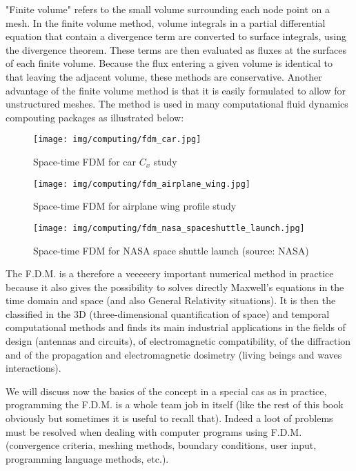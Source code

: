 	"Finite volume" refers to the small volume surrounding each node point on a mesh. In the finite volume method, volume integrals in a partial differential equation that contain a divergence term are converted to surface integrals, using the divergence theorem. These terms are then evaluated as fluxes at the surfaces of each finite volume. Because the flux entering a given volume is identical to that leaving the adjacent volume, these methods are conservative. Another advantage of the finite volume method is that it is easily formulated to allow for unstructured meshes. The method is used in many computational fluid dynamics compouting packages as illustrated below:
	\begin{figure}[H]
		\centering
		\texttt{[image: img/computing/fdm\_car.jpg]}
		\caption{Space-time FDM for car $C_x$ study}
	\end{figure}
	\begin{figure}[H]
		\centering
		\texttt{[image: img/computing/fdm\_airplane\_wing.jpg]}
		\caption{Space-time FDM for airplane wing profile study}
	\end{figure}
	\begin{figure}[H]
		\centering
		\texttt{[image: img/computing/fdm\_nasa\_spaceshuttle\_launch.jpg]}
		\caption[Space-time FDM for NASA space shuttle launch]{Space-time FDM for NASA space shuttle launch (source: NASA)}
	\end{figure}
	The F.D.M. is a therefore a veeeeery important numerical method in practice because it also gives the possibility to solves directly Maxwell's equations in the time domain and space (and also General Relativity situations). It is then the classified in the $3$D (three-dimensional quantification of space) and temporal computational methods and finds its main industrial applications in the fields of design (antennas and circuits), of electromagnetic compatibility, of the diffraction and of the propagation and electromagnetic dosimetry (living beings and waves interactions).
	
	We will discuss now the basics of the concept in a special cas as in practice, programming the F.D.M. is a whole team job in itself (like the rest of this book obviously but sometimes it is useful to recall that). Indeed a loot of problems must be resolved when dealing with computer programs using F.D.M. (convergence criteria, meshing methods, boundary conditions, user input, programming language methods, etc.).

